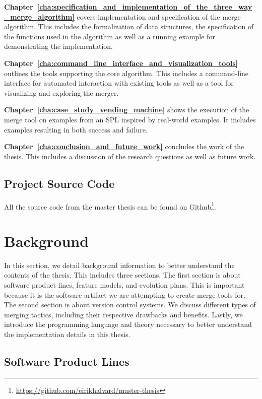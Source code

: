 \documentclass[a4paper,english]{ifimaster}
\begin{document}
\textbf{Chapter~\ref{cha:specification_and_implementation_of_the_three_way_merge_algorithm}} covers implementation and specification of the merge algorithm. This includes the formalization of data structures, the specification of the functions used in the algorithm as well as a running example for demonstrating the implementation.

\textbf{Chapter~\ref{cha:command_line_interface_and_visualization_tools}} outlines the tools supporting the core algorithm. This includes a command-line interface for automated interaction with existing tools as well as a tool for visualizing and exploring the merger.

\textbf{Chapter~\ref{cha:case_study_vending_machine}} shows the execution of the merge tool on examples from an SPL inspired by real-world examples. It includes examples resulting in both success and failure.

\textbf{Chapter~\ref{cha:conclusion_and_future_work}} concludes the work of the thesis. This includes a discussion of the research questions as well as future work.

\section{Project Source Code}%
\label{sec:project_source_code}

All the source code from the master thesis can be found on Github\footnote{\url{https://github.com/eirikhalvard/master-thesis}}.

\chapter{Background}%
\label{cha:background}

In this section, we detail background information to better understand the contents of the thesis. This includes three sections. The first section is about software product lines, feature models, and evolution plans. This is important because it is the software artifact we are attempting to create merge tools for. The second section is about version control systems. We discuss different types of merging tactics, including their respective drawbacks and benefits. Lastly, we introduce the programming language and theory necessary to better understand the implementation details in this thesis.

\section{Software Product Lines}%
\label{sec:software_product_lines}
\end{document}
